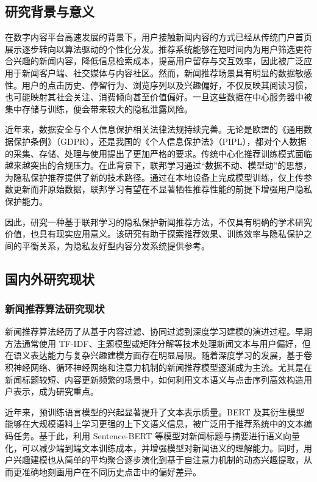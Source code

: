 \documentclass[UTF8,a4paper,12pt]{ctexart}
\numberwithin{equation}{section}
\begin{document}
\subsection{研究背景与意义}
在数字内容平台高速发展的背景下，用户接触新闻内容的方式已经从传统门户首页展示逐步转向以算法驱动的个性化分发。推荐系统能够在短时间内为用户筛选更符合兴趣的新闻内容，降低信息检索成本，提高用户留存与交互效率，因此被广泛应用于新闻客户端、社交媒体与内容社区。然而，新闻推荐场景具有明显的数据敏感性。用户的点击历史、停留行为、浏览序列以及兴趣偏好，不仅反映其阅读习惯，也可能映射其社会关注、消费倾向甚至价值偏好。一旦这些数据在中心服务器中被集中存储与训练，便会带来较大的隐私泄露风险。

近年来，数据安全与个人信息保护相关法律法规持续完善。无论是欧盟的《通用数据保护条例》（GDPR），还是我国的《个人信息保护法》（PIPL），都对个人数据的采集、存储、处理与使用提出了更加严格的要求。传统中心化推荐训练模式面临越来越突出的合规压力。在此背景下，联邦学习通过“数据不动、模型动”的思想，为隐私保护推荐提供了新的技术路径。通过在本地设备上完成模型训练，仅上传参数更新而非原始数据，联邦学习有望在不显著牺牲推荐性能的前提下增强用户隐私保护能力。

因此，研究一种基于联邦学习的隐私保护新闻推荐方法，不仅具有明确的学术研究价值，也具有现实应用意义。该研究有助于探索推荐效果、训练效率与隐私保护之间的平衡关系，为隐私友好型内容分发系统提供参考。

\subsection{国内外研究现状}
\subsubsection{新闻推荐算法研究现状}
新闻推荐算法经历了从基于内容过滤、协同过滤到深度学习建模的演进过程。早期方法通常使用 TF-IDF、主题模型或矩阵分解等技术处理新闻文本与用户偏好，但在语义表达能力与复杂兴趣建模方面存在明显局限。随着深度学习的发展，基于卷积神经网络、循环神经网络和注意力机制的新闻推荐模型逐渐成为主流。尤其是在新闻标题较短、内容更新频繁的场景中，如何利用文本语义与点击序列高效构造用户表示，成为研究重点。

近年来，预训练语言模型的兴起显著提升了文本表示质量。BERT 及其衍生模型能够在大规模语料上学习更强的上下文语义信息，被广泛用于推荐系统中的文本编码任务。基于此，利用 Sentence-BERT 等模型对新闻标题与摘要进行语义向量化，可以减少端到端文本训练成本，并增强模型对新闻语义的理解能力。同时，用户兴趣建模也从简单的平均聚合逐步演化到基于自注意力机制的动态兴趣提取，从而更准确地刻画用户在不同历史点击中的偏好差异。
\end{document}
